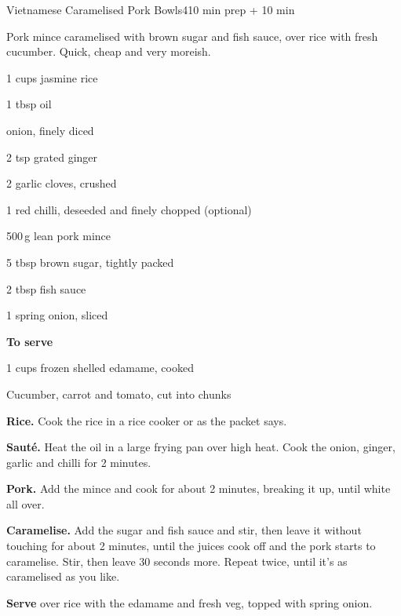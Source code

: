\begin{recipebox}{Vietnamese Caramelised Pork Bowls}{4}{10 min prep + 10 min}

Pork mince caramelised with brown sugar and fish sauce, over rice with fresh
cucumber. Quick, cheap and very moreish.

\begin{ingredients}
  \item 1 cups jasmine rice
  \item 1 tbsp oil
  \item {} onion, finely diced
  \item 2 tsp grated ginger
  \item 2 garlic cloves, crushed
  \item 1 red chilli, deseeded and finely chopped (optional)
  \item 500\,g lean pork mince
  \item 5 tbsp brown sugar, tightly packed
  \item 2 tbsp fish sauce
  \item 1 spring onion, sliced
  \item[] \textbf{To serve}
  \item 1 cups frozen shelled edamame, cooked
  \item Cucumber, carrot and tomato, cut into chunks
\end{ingredients}

\begin{method}
  \item \textbf{Rice.} Cook the rice in a rice cooker or as the packet says.
  \item \textbf{Saut\'e.} Heat the oil in a large frying pan over high heat. Cook the
        onion, ginger, garlic and chilli for 2 minutes.
  \item \textbf{Pork.} Add the mince and cook for about 2 minutes, breaking it up,
        until white all over.
  \item \textbf{Caramelise.} Add the sugar and fish sauce and stir, then leave it
        without touching for about 2 minutes, until the juices cook off and the
        pork starts to caramelise. Stir, then leave 30 seconds more. Repeat twice,
        until it's as caramelised as you like.
  \item \textbf{Serve} over rice with the edamame and fresh veg, topped with spring
        onion.
\end{method}


\end{recipebox}
